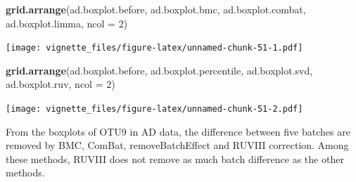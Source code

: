 \documentclass[]{book}
\newenvironment{Shaded}{\begin{snugshade}}{\end{snugshade}}
\newcommand{\KeywordTok}[1]{\textcolor[rgb]{0.13,0.29,0.53}{\textbf{#1}}}
\newcommand{\DataTypeTok}[1]{\textcolor[rgb]{0.13,0.29,0.53}{#1}}
\newcommand{\DecValTok}[1]{\textcolor[rgb]{0.00,0.00,0.81}{#1}}
\newcommand{\StringTok}[1]{\textcolor[rgb]{0.31,0.60,0.02}{#1}}
\newcommand{\OperatorTok}[1]{\textcolor[rgb]{0.81,0.36,0.00}{\textbf{#1}}}
\newcommand{\NormalTok}[1]{#1}
\begin{document}
\begin{Shaded}
\end{Shaded}

\begin{Shaded}
\begin{Highlighting}[]
\KeywordTok{grid.arrange}\NormalTok{(ad.boxplot.before, ad.boxplot.bmc, }
\NormalTok{             ad.boxplot.combat, ad.boxplot.limma, }\DataTypeTok{ncol =} \DecValTok{2}\NormalTok{)}
\end{Highlighting}
\end{Shaded}

\texttt{[image: vignette\_files/figure-latex/unnamed-chunk-51-1.pdf]}

\begin{Shaded}
\begin{Highlighting}[]
\KeywordTok{grid.arrange}\NormalTok{(ad.boxplot.before, ad.boxplot.percentile, }
\NormalTok{             ad.boxplot.svd, ad.boxplot.ruv, }\DataTypeTok{ncol =} \DecValTok{2}\NormalTok{)}
\end{Highlighting}
\end{Shaded}

\texttt{[image: vignette\_files/figure-latex/unnamed-chunk-51-2.pdf]}

From the boxplots of OTU9 in AD data, the difference between five
batches are removed by BMC, ComBat, removeBatchEffect and RUVIII
correction. Among these methods, RUVIII does not remove as much batch
difference as the other methods.
\end{document}
